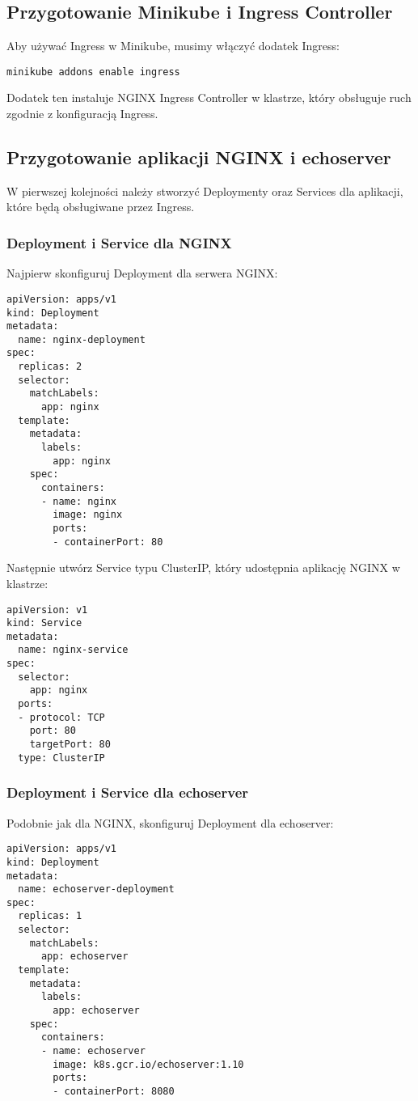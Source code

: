 \documentclass{article}
\begin{document}
\subsection{Przygotowanie Minikube i Ingress Controller}
Aby używać Ingress w Minikube, musimy włączyć dodatek Ingress:
\begin{verbatim}
minikube addons enable ingress
\end{verbatim}
Dodatek ten instaluje NGINX Ingress Controller w klastrze, który obsługuje ruch zgodnie z konfiguracją Ingress.

\subsection{Przygotowanie aplikacji NGINX i echoserver}
W pierwszej kolejności należy stworzyć Deploymenty oraz Services dla aplikacji, które będą obsługiwane przez Ingress.

\subsubsection{Deployment i Service dla NGINX}
Najpierw skonfiguruj Deployment dla serwera NGINX:
\begin{lstlisting}[]
apiVersion: apps/v1
kind: Deployment
metadata:
  name: nginx-deployment
spec:
  replicas: 2
  selector:
    matchLabels:
      app: nginx
  template:
    metadata:
      labels:
        app: nginx
    spec:
      containers:
      - name: nginx
        image: nginx
        ports:
        - containerPort: 80
\end{lstlisting}

Następnie utwórz Service typu ClusterIP, który udostępnia aplikację NGINX w klastrze:
\begin{lstlisting}[]
apiVersion: v1
kind: Service
metadata:
  name: nginx-service
spec:
  selector:
    app: nginx
  ports:
  - protocol: TCP
    port: 80
    targetPort: 80
  type: ClusterIP
\end{lstlisting}

\subsubsection{Deployment i Service dla echoserver}
Podobnie jak dla NGINX, skonfiguruj Deployment dla echoserver:
\begin{lstlisting}[]
apiVersion: apps/v1
kind: Deployment
metadata:
  name: echoserver-deployment
spec:
  replicas: 1
  selector:
    matchLabels:
      app: echoserver
  template:
    metadata:
      labels:
        app: echoserver
    spec:
      containers:
      - name: echoserver
        image: k8s.gcr.io/echoserver:1.10
        ports:
        - containerPort: 8080
\end{lstlisting}
\end{document}
